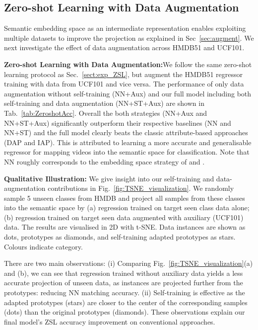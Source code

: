 \documentclass{article}
\begin{document}
\vspace{-0.1cm}
\subsection{Zero-shot Learning with Data Augmentation}\label{sec:dataAug}
Semantic embedding space as an intermediate representation enables exploiting multiple datasets to improve the projection  as explained in Sec~\ref{sec:augment}. We next investigate the effect of data augmentation across HMDB51 and UCF101.

\noindent\textbf{Zero-shot Learning with Data Augmentation:}\quad We follow the same zero-shot learning protocol as Sec.~\ref{sect:exp_ZSL}, but augment the HMDB51 regressor training with data from UCF101 and vice versa. { The performance of only data augmentation without self-training (NN+Aux) and our full model including both self-training and data augmentation (NN+ST+Aux) are shown in }Tab.~\ref{tab:ZeroshotAcc}. { Overall the  both strategies (NN+Aux and NN+ST+Aux) significantly outperform their respective baselines (NN and NN+ST) and the full model clearly beats the classic attribute-based approaches (DAP and IAP).} 
 This is attributed to learning a more accurate and generalisable regressor for mapping videos into the semantic space for classification.  Note that NN roughly corresponds to the embedding space strategy of \cite{Socher2013} and \cite{Frome2013}. 

\noindent\textbf{Qualitative Illustration:}\quad 
We give insight into our self-training and data-augmentation contributions in Fig.~\ref{fig:TSNE_visualization}. We randomly sample 5 unseen classes from HMDB and project all samples from these classes into the semantic space by (a) regression trained on target seen class data alone; (b) regression trained on target seen data augmented with auxiliary (UCF101) data. The results are visualised in 2D with t-SNE\cite{Maaten2008}. Data instances are shown as dots,  prototypes as diamonds, and self-training adapted prototypes as stars. Colours indicate category. 

There are two main observations: (i) Comparing Fig.~\ref{fig:TSNE_visualization}(a) and (b), we can see that regression trained without auxiliary data yields a less accurate projection of unseen data, as instances are projected further from the prototypes: reducing NN matching accuracy. (ii) Self-training is effective as the adapted prototypes (stars) are  closer to the center of the corresponding samples (dots) than the original prototypes (diamonds). These observations explain our final model's  ZSL accuracy improvement on conventional approaches.
\end{document}
